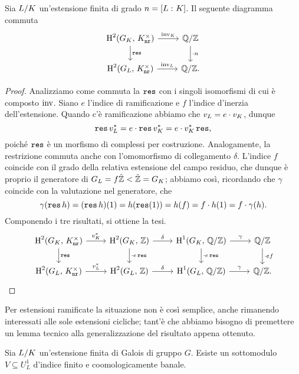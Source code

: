 \begin{proposition}
	Sia $ L/K $ un'estensione finita di grado $ n = [L\, \colon K] $. Il seguente diagramma commuta
	\[ \begin{tikzcd}
	\HH^2(G_\K, \, \knr^\times) \rar["\inv_\K"] \dar["\Res"]
	& \Q/\Z \dar["\cdot n"] \\
	\HH^2(G_L, \, \knr^\times) \rar["\inv_L"]
	& \Q/\Z.
	\end{tikzcd} \]
\end{proposition}
\begin{proof}
	Analizziamo come commuta la $ \operatorname{\mathtt{res}} $ con i singoli isomorfismi di cui è composto $ \operatorname{inv} $. Siano $ e $ l'indice di ramificazione e $ f $ l'indice d'inerzia dell'estensione. Quando c'è ramificazione abbiamo che $ v_L = e \cdot v_K $, dunque
	\[ \operatorname{\mathtt{res}} v_L^* = e \cdot \operatorname{\mathtt{res}} v_K^* = e \cdot v_K^* \operatorname{\mathtt{res}}, \]
	poiché $ \operatorname{\mathtt{res}} $ è un morfismo di complessi per costruzione. 
	Analogamente, la restrizione commuta anche con l'omomorfismo di collegamento $ \delta $. L'indice $ f $ coincide con il grado della relativa estensione del campo residuo, che dunque è proprio il generatore di $ G_L = f\hat{\mathbb{Z}} < \hat{\mathbb{Z}} = G_K $; abbiamo così, ricordando che $ \gamma $ coincide con la valutazione nel generatore, che
	$$  \gamma(\operatorname{\mathtt{res}} h) = (\operatorname{\mathtt{res}} h)(1) = h(\operatorname{\mathtt{res}}(1)) = h(f) = f\cdot h(1) = f \cdot  \gamma(h).  $$
	Componendo i tre risultati, si ottiene la tesi.
	\[ \begin{tikzcd}
	\HH^2(G_\K, \, \knr^\times) \rar["v_\K^*"] \dar["\Res"]
	& \HH^2(G_\K, \, \Z) \dar["\cdot e\Res"] \rar["\delta"]
	& \HH^1(G_\K, \, \Q/\Z) \rar["\gamma"] \dar["\cdot e\Res"]
	& \Q/\Z \dar["\cdot ef"] \\
	\HH^2(G_L, \, \knr^\times) \rar["v_L^*"]
	& \HH^2(G_L, \, \Z) \rar["\delta"]
	& \HH^1(G_L, \, \Q/\Z) \rar["\gamma"]
	& \Q/\Z.
	\end{tikzcd} \]
\end{proof}

Per estensioni ramificate la situazione non è così semplice, anche rimanendo interessati alle sole estensioni cicliche; tant'è che abbiamo bisogno di premettere un lemma tecnico alla generalizzazione del risultato appena ottenuto.

\begin{lemma} \todo[dimostrare]
	Sia $ L/K $ un'estensione finita di Galois di gruppo $ G $. Esiste un sottomodulo $ V \subseteq U_L^1 $ d'indice finito e coomologicamente banale.
\end{lemma}

